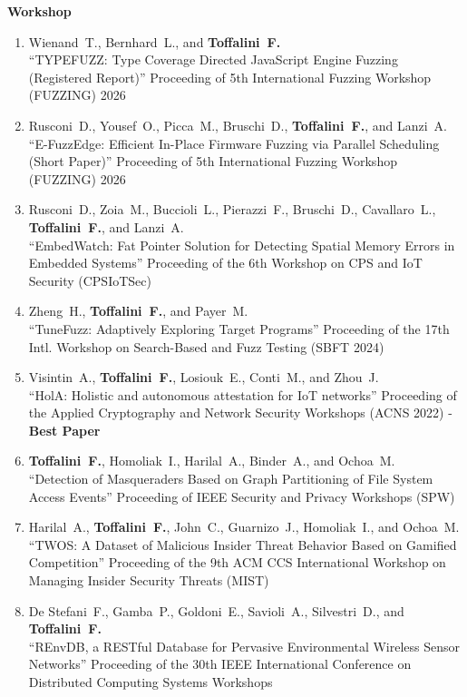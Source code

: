 \textbf{Workshop}\begin{enumerate}[leftmargin=5mm]
\item[W8] Wienand~T., Bernhard~L., and \textbf{Toffalini~F.}\\``TYPEFUZZ: Type Coverage Directed JavaScript Engine Fuzzing (Registered Report)'' Proceeding of 5th International Fuzzing Workshop (FUZZING) 2026 
\item[W7] Rusconi~D., Yousef~O., Picca~M., Bruschi~D., \textbf{Toffalini~F.}, and Lanzi~A.\\``E-FuzzEdge: Efficient In-Place Firmware Fuzzing via Parallel Scheduling (Short Paper)'' Proceeding of 5th International Fuzzing Workshop (FUZZING) 2026 
\item[W6] Rusconi~D., Zoia~M., Buccioli~L., Pierazzi~F., Bruschi~D., Cavallaro~L., \textbf{Toffalini~F.}, and Lanzi~A.\\``EmbedWatch: Fat Pointer Solution for Detecting Spatial Memory Errors in Embedded Systems'' Proceeding of the 6th Workshop on CPS and IoT Security (CPSIoTSec) 
\item[W5] Zheng~H., \textbf{Toffalini~F.}, and Payer~M.\\``TuneFuzz: Adaptively Exploring Target Programs'' Proceeding of the 17th Intl. Workshop on Search-Based and Fuzz Testing (SBFT 2024) 
\item[W4] Visintin~A., \textbf{Toffalini~F.}, Losiouk~E., Conti~M., and Zhou~J.\\``HolA: Holistic and autonomous attestation for IoT networks'' Proceeding of the Applied Cryptography and Network Security Workshops (ACNS 2022)  - \textbf{Best Paper}
\item[W3] \textbf{Toffalini~F.}, Homoliak~I., Harilal~A., Binder~A., and Ochoa~M.\\``Detection of Masqueraders Based on Graph Partitioning of File System Access Events'' Proceeding of IEEE Security and Privacy Workshops (SPW) 
\item[W2] Harilal~A., \textbf{Toffalini~F.}, John~C., Guarnizo~J., Homoliak~I., and Ochoa~M.\\``TWOS: A Dataset of Malicious Insider Threat Behavior Based on Gamified Competition'' Proceeding of the 9th ACM CCS International Workshop on Managing Insider Security Threats (MIST) 
\item[W1] De Stefani~F., Gamba~P., Goldoni~E., Savioli~A., Silvestri~D., and \textbf{Toffalini~F.}\\``REnvDB, a RESTful Database for Pervasive Environmental Wireless Sensor Networks'' Proceeding of the 30th IEEE International Conference on Distributed Computing Systems Workshops 
\end{enumerate}
